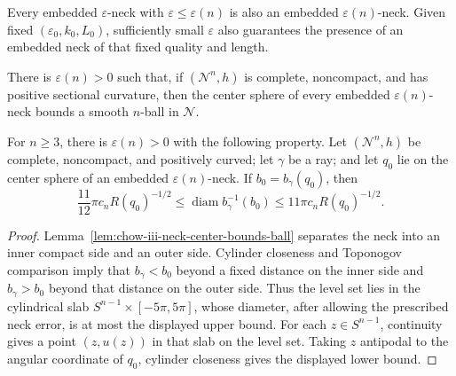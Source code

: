 \begin{remark}
\label{rem:chow-iii-neck-quality-comparison}


Every embedded \(\varepsilon\)-neck with
\(\varepsilon\le\varepsilon(n)\) is also an embedded
\(\varepsilon(n)\)-neck.  Given fixed \((\varepsilon_0,k_0,L_0)\), sufficiently
small \(\varepsilon\) also guarantees the presence of an embedded neck of
that fixed quality and length.
\end{remark}

\begin{lemma}
\label{lem:chow-iii-neck-center-bounds-ball}


There is \(\varepsilon(n)>0\) such that, if \((\mathcal N^n,h)\) is complete,
noncompact, and has positive sectional curvature, then the center sphere of
every embedded \(\varepsilon(n)\)-neck bounds a smooth \(n\)-ball in
\(\mathcal N\).
\end{lemma}

\begin{lemma}
\label{lem:chow-iii-busemann-level-diameter-neck}


For \(n\ge3\), there is \(\varepsilon(n)>0\) with the following property.
Let \((\mathcal N^n,h)\) be complete, noncompact, and positively curved; let
\(\gamma\) be a ray; and let \(q_0\) lie on the center sphere of an embedded
\(\varepsilon(n)\)-neck.  If \(b_0=b_\gamma(q_0)\), then
\[
 \frac{11}{12}\pi c_nR(q_0)^{-1/2}
 \le\operatorname{diam}b_\gamma^{-1}(b_0)
 \le11\pi c_nR(q_0)^{-1/2}.
\]
\end{lemma}
\begin{proof}
\sketch Lemma~\ref{lem:chow-iii-neck-center-bounds-ball} separates the neck into an
inner compact side and an outer side.  Cylinder closeness and Toponogov
comparison imply that \(b_\gamma<b_0\) beyond a fixed distance on the inner
side and \(b_\gamma>b_0\) beyond that distance on the outer side.  Thus the
level set lies in the cylindrical slab \(S^{n-1}\times[-5\pi,5\pi]\), whose
diameter, after allowing the prescribed neck error, is at most the displayed
upper bound.  For each \(z\in S^{n-1}\), continuity gives a point
\((z,u(z))\) in that slab on the level set.  Taking \(z\) antipodal to the
angular coordinate of \(q_0\), cylinder closeness gives the displayed lower
bound.
\end{proof}

